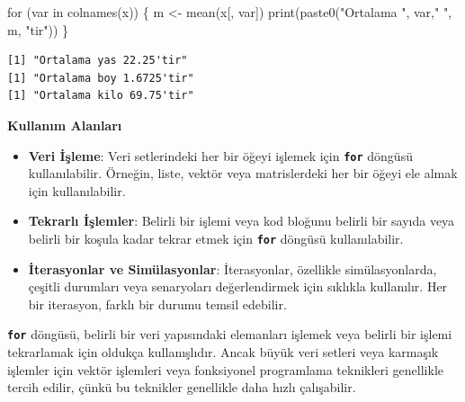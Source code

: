 \documentclass[
  letterpaper,
  DIV=11,
  numbers=noendperiod]{scrreprt}
\newenvironment{Shaded}{\begin{snugshade}}{\end{snugshade}}
\newcommand{\ControlFlowTok}[1]{\textcolor[rgb]{0.00,0.23,0.31}{#1}}
\newcommand{\FunctionTok}[1]{\textcolor[rgb]{0.28,0.35,0.67}{#1}}
\newcommand{\NormalTok}[1]{\textcolor[rgb]{0.00,0.23,0.31}{#1}}
\newcommand{\OtherTok}[1]{\textcolor[rgb]{0.00,0.23,0.31}{#1}}
\newcommand{\StringTok}[1]{\textcolor[rgb]{0.13,0.47,0.30}{#1}}
\begin{document}
\begin{Shaded}
\begin{Highlighting}[]
\ControlFlowTok{for}\NormalTok{ (var }\ControlFlowTok{in} \FunctionTok{colnames}\NormalTok{(x)) \{}
\NormalTok{    m }\OtherTok{\textless{}{-}} \FunctionTok{mean}\NormalTok{(x[, var])}
    \FunctionTok{print}\NormalTok{(}\FunctionTok{paste0}\NormalTok{(}\StringTok{"Ortalama "}\NormalTok{, var,}\StringTok{" "}\NormalTok{, m, }\StringTok{"\textquotesingle{}tir"}\NormalTok{))}
\NormalTok{\}}
\end{Highlighting}
\end{Shaded}

\begin{verbatim}
[1] "Ortalama yas 22.25'tir"
[1] "Ortalama boy 1.6725'tir"
[1] "Ortalama kilo 69.75'tir"
\end{verbatim}

\textbf{Kullanım Alanları}

\begin{itemize}
\item
  \textbf{Veri İşleme}: Veri setlerindeki her bir öğeyi işlemek için
  \textbf{\texttt{for}} döngüsü kullanılabilir. Örneğin, liste, vektör
  veya matrislerdeki her bir öğeyi ele almak için kullanılabilir.
\item
  \textbf{Tekrarlı İşlemler}: Belirli bir işlemi veya kod bloğunu
  belirli bir sayıda veya belirli bir koşula kadar tekrar etmek için
  \textbf{\texttt{for}} döngüsü kullanılabilir.
\item
  \textbf{İterasyonlar ve Simülasyonlar}: İterasyonlar, özellikle
  simülasyonlarda, çeşitli durumları veya senaryoları değerlendirmek
  için sıklıkla kullanılır. Her bir iterasyon, farklı bir durumu temsil
  edebilir.
\end{itemize}

\begin{tcolorbox}[enhanced jigsaw, colback=white, coltitle=black, colbacktitle=quarto-callout-warning-color!10!white, opacitybacktitle=0.6, opacityback=0, toprule=.15mm, bottomrule=.15mm, bottomtitle=1mm, rightrule=.15mm, breakable, arc=.35mm, colframe=quarto-callout-warning-color-frame, titlerule=0mm, left=2mm, leftrule=.75mm, toptitle=1mm, title=\textcolor{quarto-callout-warning-color}{\faExclamationTriangle}\hspace{0.5em}{Uyarı}]

\textbf{\texttt{for}} döngüsü, belirli bir veri yapısındaki elemanları
işlemek veya belirli bir işlemi tekrarlamak için oldukça kullanışlıdır.
Ancak büyük veri setleri veya karmaşık işlemler için vektör işlemleri
veya fonksiyonel programlama teknikleri genellikle tercih edilir, çünkü
bu teknikler genellikle daha hızlı çalışabilir.

\end{tcolorbox}
\end{document}
